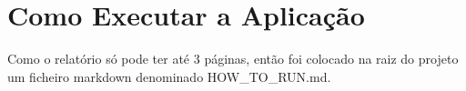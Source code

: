 \section{Como Executar a Aplicação}
Como o relatório só pode ter até 3 páginas, então foi colocado na raiz do projeto um ficheiro markdown denominado HOW\_TO\_RUN.md.